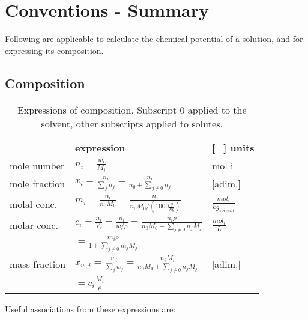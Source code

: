 \documentclass[onecolumn]{article}
\begin{document}
\section{Conventions - Summary} %
Following are applicable to calculate the chemical potential of a solution, and for expressing its composition.
\label{sec:conventions}
\subsection{Composition}
\label{subsec:composition}
\begin{table}[h]
\begin{tabular}{|lll|}
\hline
		      & expression                                                                                    & [=] units                     \\
\hline
mole number   & $n_i = \frac{w_i}{M_i}$                                                                                   & mol i                         \\
mole fraction & $x_i = \frac{n_i}{\sum_j{n_j}} =  \frac{n_i}{n_0 + \sum_{j \neq 0}{n_j}}$                         & [adim.]                       \\
molal  conc.  & $m_i = \frac{n_i}{n_0 M_0} = \frac{n_i}{n_0 M_0 / \left(1000 \frac{g}{kg} \right)}$               & $\frac{mol_i} {kg_{solvent}}$ \\
molar  conc.  & $c_i = \frac{n_i}{V_r} = \frac{n_i}{w/\rho} = \frac{n_i \rho}{n_0 M_0 + \sum_{j\neq 0}{n_j M_j}}$ & $\frac{mol_i}{L}$\\ 
              & $= \frac{m_i \rho}{1 + \sum_{j\neq 0}{m_j M_j}}$     &       \\
mass fraction & $x_{w,i} = \frac{w_i}{\sum_j{w_j}} =  \frac{n_i M_i}{n_0 M_0 + \sum_{j \neq 0}{n_j M_j}}$                         & [adim.]                       \\
			  & $= c_i \frac{M_i}{\rho}$  & \\
\hline
\end{tabular}
\caption{Expressions of composition. Subscript 0 applied to the solvent, other subscripts applied to solutes.}
\label{table:composition_expr}
\end{table}
Useful associations from these expressions are:\\
\[

\]
\end{document}
